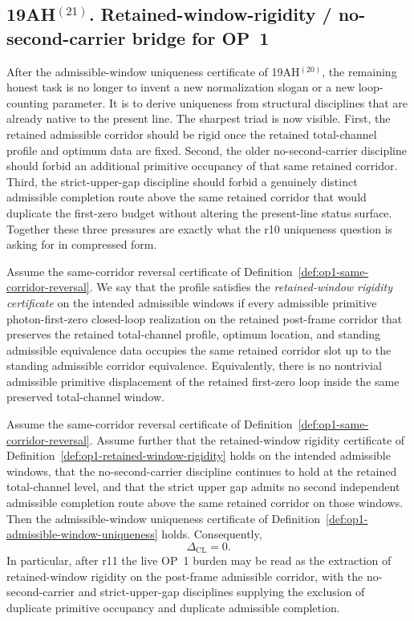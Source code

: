 \subsection*{19AH$^{(21)}$. Retained-window-rigidity / no-second-carrier bridge for OP~1}
After the admissible-window uniqueness certificate of 19AH$^{(20)}$, the remaining honest task is no longer to invent a new normalization slogan or a new loop-counting parameter. It is to derive uniqueness from structural disciplines that are already native to the present line. The sharpest triad is now visible. First, the retained admissible corridor should be rigid once the retained total-channel profile and optimum data are fixed. Second, the older no-second-carrier discipline should forbid an additional primitive occupancy of that same retained corridor. Third, the strict-upper-gap discipline should forbid a genuinely distinct admissible completion route above the same retained corridor that would duplicate the first-zero budget without altering the present-line status surface. Together these three pressures are exactly what the r10 uniqueness question is asking for in compressed form.

\begin{definition}
\label{def:op1-retained-window-rigidity}
Assume the same-corridor reversal certificate of Definition~\ref{def:op1-same-corridor-reversal}. We say that the profile satisfies the \emph{retained-window rigidity certificate} on the intended admissible windows if every admissible primitive photon-first-zero closed-loop realization on the retained post-frame corridor that preserves the retained total-channel profile, optimum location, and standing admissible equivalence data occupies the same retained corridor slot up to the standing admissible corridor equivalence. Equivalently, there is no nontrivial admissible primitive displacement of the retained first-zero loop inside the same preserved total-channel window.
\end{definition}

\begin{proposition}
\label{prop:op1-rigidity-gap-uniqueness-bridge}
Assume the same-corridor reversal certificate of Definition~\ref{def:op1-same-corridor-reversal}. Assume further that the retained-window rigidity certificate of Definition~\ref{def:op1-retained-window-rigidity} holds on the intended admissible windows, that the no-second-carrier discipline continues to hold at the retained total-channel level, and that the strict upper gap admits no second independent admissible completion route above the same retained corridor on those windows. Then the admissible-window uniqueness certificate of Definition~\ref{def:op1-admissible-window-uniqueness} holds. Consequently,
\[
  \Delta_{\mathrm{CL}} = 0.
\]
In particular, after r11 the live OP~1 burden may be read as the extraction of retained-window rigidity on the post-frame admissible corridor, with the no-second-carrier and strict-upper-gap disciplines supplying the exclusion of duplicate primitive occupancy and duplicate admissible completion.
\end{proposition}


